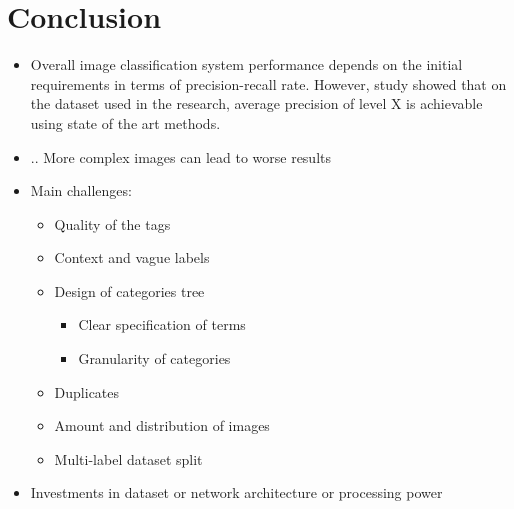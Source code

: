 \chapter{Conclusion}
\label{chap:conclusion}


\begin{itemize}
    \item Overall image classification system performance depends on the initial requirements in terms of precision-recall rate. However, study showed that on the dataset used in the research, average precision of level X is achievable using state of the art methods.
    \item .. More complex images can lead to worse results
    \item Main challenges:
    \begin{itemize}
        \item Quality of the tags
        \item Context and vague labels
        \item Design of categories tree
        \begin{itemize}
            \item Clear specification of terms
            \item Granularity of categories
        \end{itemize}
        \item Duplicates
        \item Amount and distribution of images
        \item Multi-label dataset split
    \end{itemize}
    \item Investments in dataset or network architecture or processing power
\end{itemize}